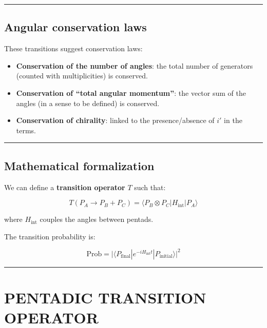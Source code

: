 \documentclass[11pt]{article}
\providecommand{\tightlist}{%
\setlength{\itemsep}{2pt}\setlength{\parskip}{6pt}
}
\begin{document}
\begin{center}\rule{0.5\linewidth}{0.5pt}\end{center}

\hypertarget{angular-conservation-laws}{%
\subsection{Angular conservation laws}\label{angular-conservation-laws}}

These transitions suggest conservation laws:

\begin{itemize}
\tightlist
\item
  \textbf{Conservation of the number of angles}: the total number of
  generators (counted with multiplicities) is conserved.
\item
  \textbf{Conservation of ``total angular momentum''}: the vector sum of
  the angles (in a sense to be defined) is conserved.
\item
  \textbf{Conservation of chirality}: linked to the presence/absence of
  \(i'\) in the terms.
\end{itemize}

\begin{center}\rule{0.5\linewidth}{0.5pt}\end{center}

\hypertarget{mathematical-formalization}{%
\subsection{Mathematical
formalization}\label{mathematical-formalization}}

We can define a \textbf{transition operator} \(T\) such that:

\[T(P_A \to P_B + P_C) = \langle P_B \otimes P_C | H_{\text{int}} | P_A \rangle\]

where \(H_{\text{int}}\) couples the angles between pentads.

The transition probability is:

\[\text{Prob} = \big| \langle P_{\text{final}} | e^{-i H_{\text{int}} t} | P_{\text{initial}} \rangle \big|^2\]

\begin{center}\rule{0.5\linewidth}{0.5pt}\end{center}

\hypertarget{pentadic-transition-operator}{%
\section{PENTADIC TRANSITION
OPERATOR}\label{pentadic-transition-operator}}
\end{document}
